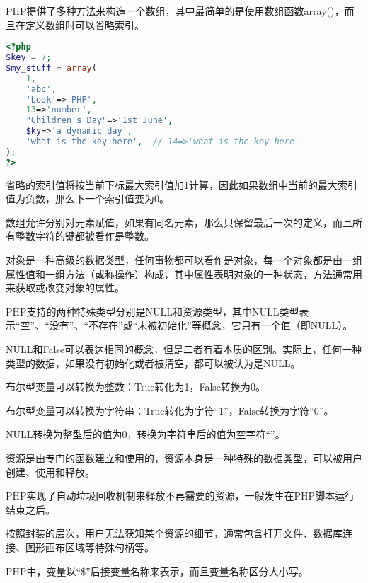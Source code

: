 PHP提供了多种方法来构造一个数组，其中最简单的是使用数组函数array()，而且在定义数组时可以省略索引。

\begin{lstlisting}[language=PHP]
<?php
$key = 7;
$my_stuff = array(
	1,
	'abc',
	'book'=>'PHP',
	13=>'number',
	"Children's Day"=>'1st June',
	$ky=>'a dynamic day',
	'what is the key here',  // 14=>'what is the key here'
);
?>
\end{lstlisting}

省略的索引值将按当前下标最大索引值加1计算，因此如果数组中当前的最大索引值为负数，那么下一个索引值变为0。

数组允许分别对元素赋值，如果有同名元素，那么只保留最后一次的定义，而且所有整数字符的键都被看作是整数。



对象是一种高级的数据类型，任何事物都可以看作是对象，每一个对象都是由一组属性值和一组方法（或称操作）构成，其中属性表明对象的一种状态，方法通常用来获取或改变对象的属性。




PHP支持的两种特殊类型分别是NULL和资源类型，其中NULL类型表示“空”、“没有”、“不存在”或“未被初始化”等概念，它只有一个值（即NULL）。

NULL和False可以表达相同的概念，但是二者有着本质的区别。实际上，任何一种类型的数据，如果没有初始化或者被清空，都可以被认为是NULL。

\begin{compactitem}
\item 布尔型变量可以转换为整数：True转化为1，False转换为0。

\item 布尔型变量可以转换为字符串：True转化为字符“1”，False转换为字符“0”。

\end{compactitem}

NULL转换为整型后的值为0，转换为字符串后的值为空字符“”。



资源是由专门的函数建立和使用的，资源本身是一种特殊的数据类型，可以被用户创建、使用和释放。

PHP实现了自动垃圾回收机制来释放不再需要的资源，一般发生在PHP脚本运行结束之后。

按照封装的层次，用户无法获知某个资源的细节，通常包含打开文件、数据库连接、图形画布区域等特殊句柄等。





PHP中，变量以“\$”后接变量名称来表示，而且变量名称区分大小写。

